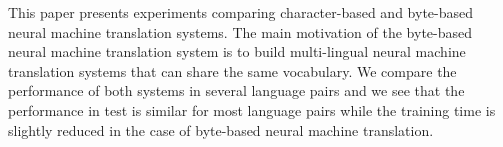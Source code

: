 This paper presents experiments comparing character-based and byte-based neural machine translation systems. The main motivation of the byte-based neural machine translation system is to build multi-lingual neural machine translation systems that can share the same vocabulary. We compare the performance of both systems in several language pairs and we see that the performance in test is similar for most language pairs while the training time is slightly reduced in the case of byte-based neural machine translation.
